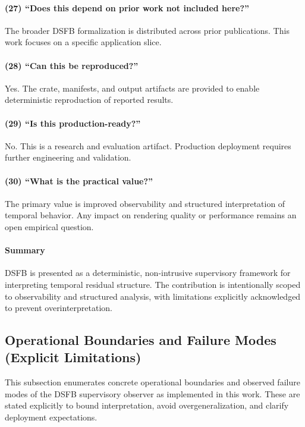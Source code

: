 \documentclass[11pt,letterpaper]{article}
\theoremstyle{gcresult}
\theoremstyle{definition}
\begin{document}
\paragraph{(27) ``Does this depend on prior work not included here?''}
The broader DSFB formalization is distributed across prior publications. This work focuses on a specific application slice.

\paragraph{(28) ``Can this be reproduced?''}
Yes. The crate, manifests, and output artifacts are provided to enable deterministic reproduction of reported results.

\paragraph{(29) ``Is this production-ready?''}
No. This is a research and evaluation artifact. Production deployment requires further engineering and validation.

\paragraph{(30) ``What is the practical value?''}
The primary value is improved observability and structured interpretation of temporal behavior. Any impact on rendering quality or performance remains an open empirical question.

\paragraph{Summary}
DSFB is presented as a deterministic, non-intrusive supervisory framework for interpreting temporal residual structure. The contribution is intentionally scoped to observability and structured analysis, with limitations explicitly acknowledged to prevent overinterpretation.

\subsection{Operational Boundaries and Failure Modes (Explicit Limitations)}

This subsection enumerates concrete operational boundaries and observed failure modes of the DSFB supervisory observer as implemented in this work. These are stated explicitly to bound interpretation, avoid overgeneralization, and clarify deployment expectations.
\end{document}
